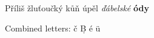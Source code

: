 \documentclass{article}
\begin{document}
Příliš žluťoučký kůň úpěl \textit{ďábelské} \textbf{ódy}

Combined letters: \v{c} \d{B} \'{e} \"{u}
\end{document}
